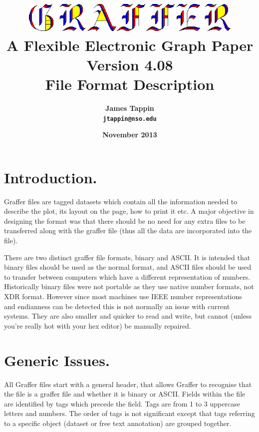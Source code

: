 \documentclass[english]{article}
\begin{document}
\title{\includegraphics[width=0.80\textwidth]{logo} \\
A Flexible Electronic Graph Paper\\
Version 4.08\\
File Format Description}

\author{\textsf{\textbf{\Large James Tappin}}\\
\texttt{\textbf{\Large jtappin@nso.edu}}}

\date{\textsf{\textbf{\large November 2013}}}

\maketitle

\tableofcontents{}
\section{Introduction.}

Graffer files are tagged datasets which contain all the information
needed to describe the plot, its layout on the page, how to print
it etc. A major objective in designing the format was that there should
be no need for any extra files to be transferred along with the graffer
file (thus all the data are incorporated into the file).

There are two distinct graffer file formats, binary and ASCII. It is
intended that binary files should be used as the normal format, and
ASCII files should be used to transfer between computers which have a
different representation of numbers. Historically binary files were not
portable as they use native number formats, not XDR format. However
since most machines use IEEE number representations and endianness can
be detected this is not normally an issue with current systems. They
are also smaller and quicker to read and write, but cannot (unless
you're really hot with your hex editor) be manually repaired.


\section{Generic Issues.}

All Graffer files start with a general header, that allows Graffer
to recognise that the file is a graffer file and whether it is binary
or ASCII. Fields within the file are identified by tags which precede
the field. Tags are from 1 to 3 uppercase letters and numbers. The
order of tags is not significant except that tags referring to a specific
object (dataset or free text annotation) are grouped together.
\end{document}
